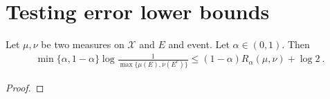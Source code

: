 \chapter{Testing error lower bounds}

\begin{lemma}
  \label{lem:testing_bound_renyi}
  Let $\mu, \nu$ be two measures on $\mathcal X$ and $E$ and event. Let $\alpha \in (0,1)$. Then
  \begin{align*}
  \min\{\alpha, 1 - \alpha\} \log\frac{1}{\max\{\mu(E), \nu(E^c)\}} \le (1 - \alpha) R_{\alpha}(\mu, \nu)  + \log 2 \: .
  \end{align*}
\end{lemma}

\begin{proof}
\end{proof}